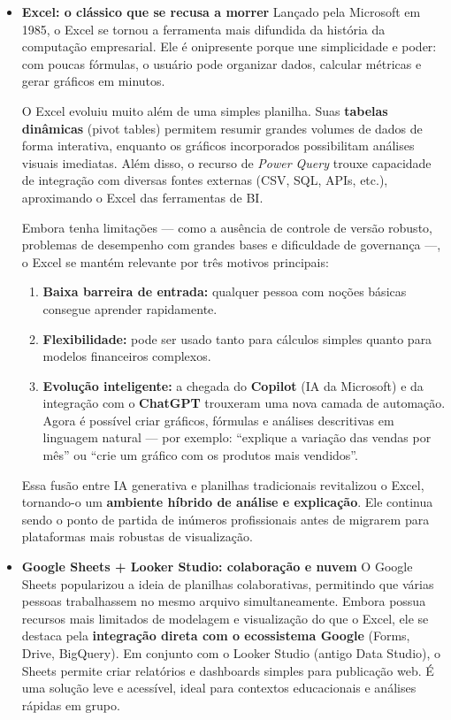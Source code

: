 \begin{itemize}[leftmargin=*]

  \item \textbf{Excel: o clássico que se recusa a morrer}  
  Lançado pela Microsoft em 1985, o Excel se tornou a ferramenta mais difundida da história da computação empresarial. Ele é onipresente porque une simplicidade e poder: com poucas fórmulas, o usuário pode organizar dados, calcular métricas e gerar gráficos em minutos.  

  O Excel evoluiu muito além de uma simples planilha. Suas \textbf{tabelas dinâmicas} (pivot tables) permitem resumir grandes volumes de dados de forma interativa, enquanto os gráficos incorporados possibilitam análises visuais imediatas. Além disso, o recurso de \textit{Power Query} trouxe capacidade de integração com diversas fontes externas (CSV, SQL, APIs, etc.), aproximando o Excel das ferramentas de BI.  

  Embora tenha limitações — como a ausência de controle de versão robusto, problemas de desempenho com grandes bases e dificuldade de governança —, o Excel se mantém relevante por três motivos principais:
  \begin{enumerate}
    \item \textbf{Baixa barreira de entrada:} qualquer pessoa com noções básicas consegue aprender rapidamente.
    \item \textbf{Flexibilidade:} pode ser usado tanto para cálculos simples quanto para modelos financeiros complexos.
    \item \textbf{Evolução inteligente:} a chegada do \textbf{Copilot} (IA da Microsoft) e da integração com o \textbf{ChatGPT} trouxeram uma nova camada de automação. Agora é possível criar gráficos, fórmulas e análises descritivas em linguagem natural — por exemplo: “explique a variação das vendas por mês” ou “crie um gráfico com os produtos mais vendidos”.  
  \end{enumerate}

  Essa fusão entre IA generativa e planilhas tradicionais revitalizou o Excel, tornando-o um \textbf{ambiente híbrido de análise e explicação}. Ele continua sendo o ponto de partida de inúmeros profissionais antes de migrarem para plataformas mais robustas de visualização.

  \item \textbf{Google Sheets + Looker Studio: colaboração e nuvem}  
  O Google Sheets popularizou a ideia de planilhas colaborativas, permitindo que várias pessoas trabalhassem no mesmo arquivo simultaneamente. Embora possua recursos mais limitados de modelagem e visualização do que o Excel, ele se destaca pela \textbf{integração direta com o ecossistema Google} (Forms, Drive, BigQuery).  
  Em conjunto com o Looker Studio (antigo Data Studio), o Sheets permite criar relatórios e dashboards simples para publicação web. É uma solução leve e acessível, ideal para contextos educacionais e análises rápidas em grupo.


\end{itemize}
